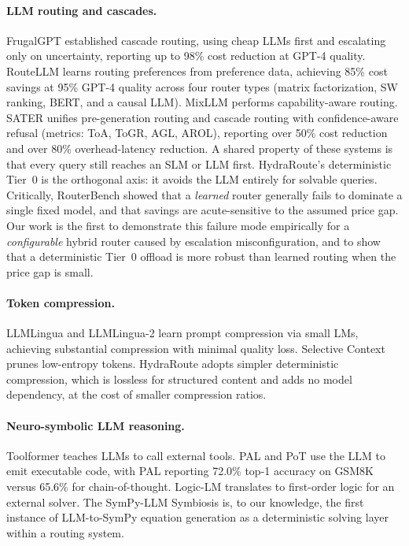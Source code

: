 \documentclass[11pt]{article}
\newcommand{\system}{HydraRoute\xspace}
\begin{document}
\paragraph{LLM routing and cascades.}
FrugalGPT \cite{chen2023frugalgpt} established cascade routing, using cheap LLMs first and escalating only on uncertainty, reporting up to 98\% cost reduction at GPT-4 quality. RouteLLM \cite{ong2024routellm} learns routing preferences from preference data, achieving 85\% cost savings at 95\% GPT-4 quality across four router types (matrix factorization, SW ranking, BERT, and a causal LLM). MixLLM \cite{jiang2024mixllm} performs capability-aware routing. SATER \cite{shen2025sater} unifies pre-generation routing and cascade routing with confidence-aware refusal (metrics: ToA, ToGR, AGL, AROL), reporting over 50\% cost reduction and over 80\% overhead-latency reduction. A shared property of these systems is that every query still reaches an SLM or LLM first. \system's deterministic Tier~0 is the orthogonal axis: it avoids the LLM entirely for solvable queries. Critically, RouterBench \cite{hu2024routerbench} showed that a \emph{learned} router generally fails to dominate a single fixed model, and that savings are acute-sensitive to the assumed price gap. Our work is the first to demonstrate this failure mode empirically for a \emph{configurable} hybrid router caused by escalation misconfiguration, and to show that a deterministic Tier~0 offload is more robust than learned routing when the price gap is small.

\paragraph{Token compression.}
LLMLingua \cite{jiang2023llmlingua} and LLMLingua-2 \cite{jiang2024llmlingua2} learn prompt compression via small LMs, achieving substantial compression with minimal quality loss. Selective Context \cite{li2023selective} prunes low-entropy tokens. \system adopts simpler deterministic compression, which is lossless for structured content and adds no model dependency, at the cost of smaller compression ratios.

\paragraph{Neuro-symbolic LLM reasoning.}
Toolformer \cite{schick2023toolformer} teaches LLMs to call external tools. PAL \cite{gao2022pal} and PoT \cite{chen2022pot} use the LLM to emit executable code, with PAL reporting 72.0\% top-1 accuracy on GSM8K versus 65.6\% for chain-of-thought. Logic-LM \cite{pan2023logiclm} translates to first-order logic for an external solver. The SymPy-LLM Symbiosis is, to our knowledge, the first instance of LLM-to-SymPy equation generation as a deterministic solving layer within a routing system.
\end{document}
